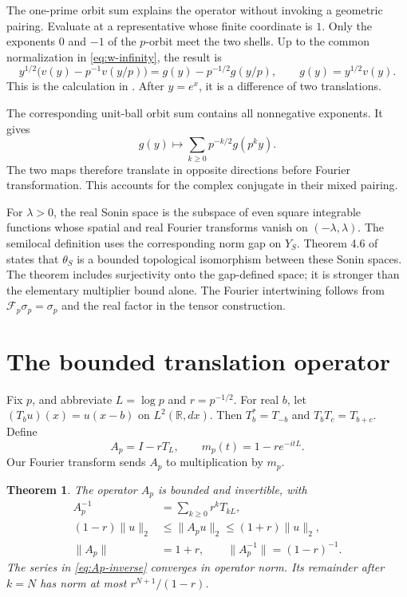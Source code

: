 \documentclass[11pt,letterpaper]{article}
\newtheorem{theorem}{Theorem}[section]
\theoremstyle{definition}
\theoremstyle{remark}
\newcommand{\R}{\mathbb R}
\begin{document}
The one-prime orbit sum explains the operator without invoking a
geometric pairing. Evaluate at a representative whose finite coordinate
is $1$. Only the exponents $0$ and $-1$ of the $p$-orbit meet the two
shells. Up to the common normalization in \eqref{eq:w-infinity}, the
result is
\begin{equation}\label{eq:orbit-sum}
 y^{1/2}\bigl(v(y)-p^{-1}v(y/p)\bigr)
 =g(y)-p^{-1/2}g(y/p),\qquad g(y)=y^{1/2}v(y).
\end{equation}
This is the calculation in \cite[Section 4.6, equation (57)]{CCM}.
After $y=e^x$, it is a difference of two translations.

The corresponding unit-ball orbit sum contains all nonnegative
exponents. It gives
\begin{equation}\label{eq:eta-orbits}
 g(y)\longmapsto\sum_{k\ge0}p^{-k/2}g(p^ky).
\end{equation}
The two maps therefore translate in opposite directions before
Fourier transformation. This accounts for the complex conjugate in
their mixed pairing.

For $\lambda>0$, the real Sonin space is the subspace of even square
integrable functions whose spatial and real Fourier transforms vanish
on $(-\lambda,\lambda)$. The semilocal definition uses the corresponding
norm gap on $Y_S$. Theorem 4.6 of \cite{CCM} states that $\theta_S$
is a bounded topological isomorphism between these Sonin spaces.
The theorem includes surjectivity onto the gap-defined space; it is
stronger than the elementary multiplier bound alone. The Fourier
intertwining follows from $\mathscr F_p\sigma_p=\sigma_p$ and the
real factor in the tensor construction.

\section{The bounded translation operator}

Fix $p$, and abbreviate $L=\log p$ and $r=p^{-1/2}$. For real $b$,
let $(T_bu)(x)=u(x-b)$ on $L^2(\R,dx)$. Then
$T_b^*=T_{-b}$ and $T_bT_c=T_{b+c}$. Define
\begin{equation}\label{eq:Ap}
 A_p=I-rT_L,\qquad m_p(t)=1-re^{-itL}.
\end{equation}
Our Fourier transform sends $A_p$ to multiplication by $m_p$.

\begin{theorem}\label{thm:local-correspondence:inverse}
The operator $A_p$ is bounded and invertible, with
\begin{align}
 A_p^{-1}&=\sum_{k\ge0}r^kT_{kL},\label{eq:Ap-inverse}\\
 (1-r)\|u\|_2&\le\|A_pu\|_2\le(1+r)\|u\|_2,\label{eq:Ap-bounds}\\
 \|A_p\|&=1+r,\qquad \|A_p^{-1}\|=(1-r)^{-1}.
 \label{eq:Ap-exact-norms}
\end{align}
The series in \eqref{eq:Ap-inverse} converges in operator norm.
Its remainder after $k=N$ has norm at most $r^{N+1}/(1-r)$.
\end{theorem}
\end{document}
